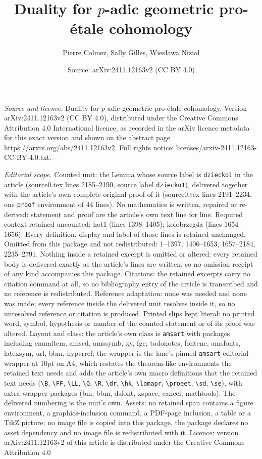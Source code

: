 \documentclass[10pt,a4paper]{amsart}
\title[Duality for $p$-adic geometric pro-\'etale cohomology]{Duality for $p$-adic geometric pro-\'etale cohomology}
\author{Pierre Colmez, Sally Gilles, Wies{\l}awa Nizio{\l}}
\date{Source: arXiv:2411.12163v2 (CC BY 4.0)}
\begin{document}
\maketitle

\noindent\emph{Source and licence.} Duality for $p$-adic geometric pro-\'etale cohomology. Version arXiv:2411.12163v2 (CC BY 4.0), distributed under the Creative Commons Attribution 4.0 International licence, as recorded in the arXiv licence metadata for this exact version and shown on the abstract page https://arxiv.org/abs/2411.12163v2. Full rights notice: licenses/arxiv-2411.12163-CC-BY-4.0.txt.\par\smallskip

\noindent\textit{Editorial scope.} Counted unit: the Lemma whose source label is \texttt{dziecko1} in the article (source0.tex lines 2185--2190, source label \texttt{dziecko1}), delivered together with the article's own complete original proof of it (source0.tex lines 2191--2234, one \texttt{proof} environment of 44 lines). No mathematics is written, repaired or re-derived: statement and proof are the article's own text line for line. Required context retained uncounted: hot1 (lines 1398--1405); kolobrzeg4a (lines 1654--1656). Every definition, display and label of those lines is retained unchanged. Omitted from this package and not redistributed: 1--1397, 1406--1653, 1657--2184, 2235--2791. Nothing inside a retained excerpt is omitted or altered: every retained body is delivered exactly as the article's lines are written, so no omission receipt of any kind accompanies this package. Citations: the retained excerpts carry no citation command at all, so no bibliography entry of the article is transcribed and no reference is redistributed. Reference adaptation: none was needed and none was made; every reference inside the delivered unit resolves inside it, so no unresolved reference or citation is produced. Printed slips kept literal: no printed word, symbol, hypothesis or number of the counted statement or of its proof was altered. Layout and class: the article's own class is \texttt{amsart} with packages including enumitem, amscd, amssymb, xy, fge, todonotes, fontenc, amsfonts, latexsym, url, bbm, hyperref; the wrapper is the lane's pinned \texttt{amsart} editorial wrapper at 10pt on A4, which restates the theorem-like environments the retained text needs and adds the article's own macro definitions that the retained text needs (\texttt{\textbackslash B}, \texttt{\textbackslash FF}, \texttt{\textbackslash LL}, \texttt{\textbackslash Q}, \texttt{\textbackslash R}, \texttt{\textbackslash dr}, \texttt{\textbackslash hk}, \texttt{\textbackslash lomapr}, \texttt{\textbackslash proeet}, \texttt{\textbackslash sd}, \texttt{\textbackslash se}), with extra wrapper packages (bm, bbm, dsfont, xspace, cancel, mathtools). The delivered numbering is the unit's own. Assets: no retained span contains a figure environment, a graphics-inclusion command, a PDF-page inclusion, a table or a TikZ picture; no image file is copied into this package, the package declares no asset dependency and no image file is redistributed with it. Licence: version arXiv:2411.12163v2 of this article is distributed under the Creative Commons Attribution 4.0 
\end{document}
